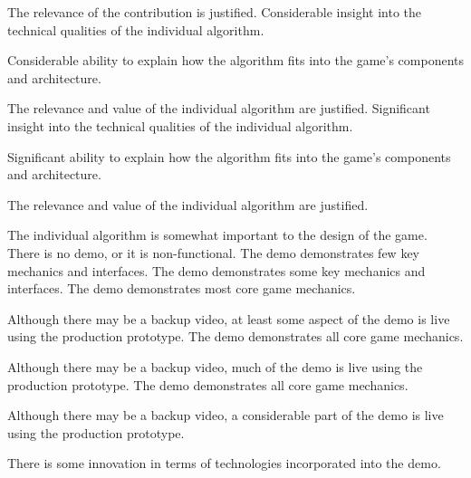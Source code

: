 \documentclass{../../fal_assignment}
\begin{document}
\begin{markingrubric}
            \par The relevance of the contribution is justified.
        \grade Considerable insight into the technical qualities of the individual algorithm.
            \par Considerable ability to explain how the algorithm fits into the game's components and architecture.
            \par The relevance and value of the individual algorithm are justified.
        \grade Significant insight into the technical qualities of the individual algorithm.
            \par Significant ability to explain how the algorithm fits into the game's components and architecture.
            \par The relevance and value of the  individual algorithm are justified.
            \par The  individual algorithm is somewhat important to the design of the game.
%
        \grade\fail There is no demo, or it is non-functional.
        \grade The demo demonstrates few key mechanics and interfaces.
        \grade The demo demonstrates some key mechanics and interfaces.
        \grade The demo demonstrates most core game mechanics.
            \par Although there may be a backup video, at least some aspect of the demo is live using the production prototype.
        \grade The demo demonstrates all core game mechanics.
            \par Although there may be a backup video, much of the demo is live using the production prototype.
        \grade The demo demonstrates all core game mechanics.
            \par Although there may be a backup video, a considerable part of the demo is live using the production prototype.
            \par There is some innovation in terms of technologies incorporated into the demo.
\end{markingrubric}
\end{document}
